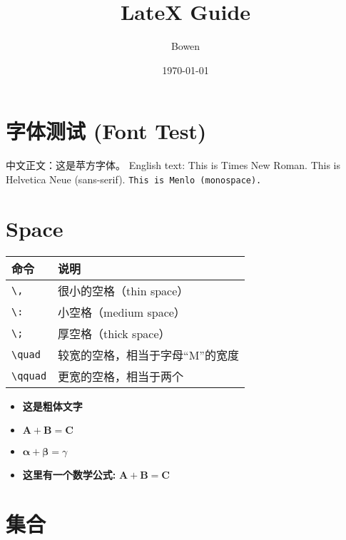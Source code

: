 \documentclass[a4paper,12pt]{article}
\begin{document}
    \title{LateX Guide}
    \author{Bowen}
    \date{\today}
    \maketitle
    \section*{字体测试 (Font Test)}
    中文正文：这是苹方字体。
    English text: This is Times New Roman.
    \textsf{This is Helvetica Neue (sans-serif).}
    \texttt{This is Menlo (monospace).}



    \section{Space}

    \begin{tabular}{ll}
        \toprule
        \textbf{命令}   & \textbf{说明}       \\
        \midrule
        \verb|\,|     & 很小的空格（thin space） \\
        \verb|\:|     & 小空格（medium space） \\
        \verb|\;|     & 厚空格（thick space）  \\
        \verb|\quad|  & 较宽的空格，相当于字母“M”的宽度 \\
        \verb|\qquad| & 更宽的空格，相当于两个 \quad \\
    \end{tabular}


    \begin{itemize}
        \item \textbf{这是粗体文字}
        \item $\mathbf{A} + \mathbf{B} = \mathbf{C}$
        \item $\bm{\alpha + \beta} = \gamma$
        \item \textbf{这里有一个数学公式: } $\mathbf{A + B = C}$
    \end{itemize}



    \section{集合}
\end{document}
